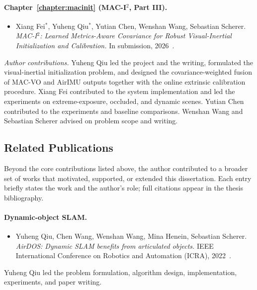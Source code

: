 \paragraph{Chapter~\ref{chapter:macinit} (MAC-I$^2$, Part III).}
\begin{itemize}
    \item Xiang Fei$^{*}$, Yuheng Qiu$^{*}$, Yutian Chen, Wenshan Wang, Sebastian Scherer. \emph{MAC-I$^2$: Learned Metrics-Aware Covariance for Robust Visual-Inertial Initialization and Calibration.} In submission, 2026~\cite{fei2026macinit}.
\end{itemize}
\textit{Author contributions.}
Yuheng Qiu led the project and the writing, formulated the visual-inertial initialization problem, and designed the covariance-weighted fusion of MAC-VO and AirIMU outputs together with the online extrinsic calibration procedure.
Xiang Fei contributed to the system implementation and led the experiments on extreme-exposure, occluded, and dynamic scenes.
Yutian Chen contributed to the experiments and baseline comparisons.
Wenshan Wang and Sebastian Scherer advised on problem scope and writing.

\subsection{Related Publications}
\label{subsec:related_publications}

Beyond the core contributions listed above, the author contributed to a broader set of works that motivated, supported, or extended this dissertation.
Each entry briefly states the work and the author's role; full citations appear in the thesis bibliography.

\paragraph{Dynamic-object SLAM.}
\begin{itemize}
    \item Yuheng Qiu, Chen Wang, Wenshan Wang, Mina Henein, Sebastian Scherer. \emph{AirDOS: Dynamic SLAM benefits from articulated objects.} IEEE International Conference on Robotics and Automation (ICRA), 2022~\cite{qiu2022airdos}.
\end{itemize}
Yuheng Qiu led the problem formulation, algorithm design, implementation, experiments, and paper writing.


